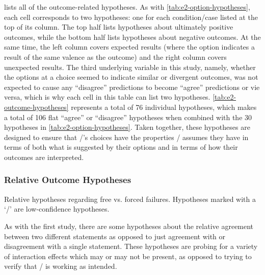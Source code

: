  lists all of the outcome-related hypotheses.
%
As with \cref{tab:e2-option-hypotheses}, each cell corresponds to two hypotheses: one for each condition/case listed at the top of its column.
%
The top half lists hypotheses about ultimately positive outcomes, while the bottom half lists hypotheses about negative outcomes.
%
At the same time, the left column covers expected results (where the option indicates a result of the same valence as the outcome) and the right column covers unexpected results.
%
The third underlying variable in this study, namely, whether the options at a choice seemed to indicate similar or divergent outcomes, was not expected to cause any ``disagree'' predictions to become ``agree'' predictions or vie versa, which is why each cell in this table can list two hypotheses.
%
\cref{tab:e2-outcome-hypotheses} represents a total of 76 individual hypotheses, which makes a total of 106 flat ``agree'' or ``disagree'' hypotheses when combined with the 30 hypotheses in \cref{tab:e2-option-hypotheses}.
%
Taken together, these hypotheses are designed to ensure that \dunyazad/'s choices have the properties \dunyazad/ assumes they have in terms of both what is suggested by their options and in terms of how their outcomes are interpreted.

\subsubsection{Relative Outcome Hypotheses}

\begin{table}[!h]
\centering
\bgroup
\def\arraystretch{1.3}
\setlength{\tabcolsep}{0.6em}

\egroup
\caption[Retrospective free vs\@. forced failure hypotheses]{Relative hypotheses regarding free vs\@. forced failures. Hypotheses marked with a `\lc/' are low-confidence hypotheses.}
  \label{tab:e2-free-vs-forced-failure-hypotheses}
\end{table}

As with the first study, there are some hypotheses about the relative agreement between two different statements as opposed to just agreement with or disagreement with a single statement.
%
These hypotheses are probing for a variety of interaction effects which may or may not be present, as opposed to trying to verify that \dunyazad/ is working as intended.


